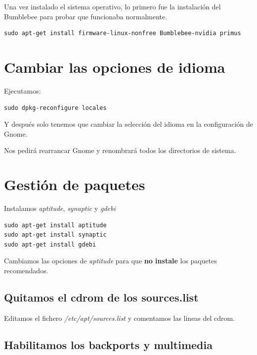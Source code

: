 \documentclass[12pt,spanish,]{scrartcl}
\begin{document}
Una vez instalado el sistema operativo, lo primero fue la instalación
del Bumblebee para probar que funcionaba normalmente.

\begin{verbatim}
sudo apt-get install firmware-linux-nonfree Bumblebee-nvidia primus
\end{verbatim}

\section{Cambiar las opciones de
idioma}\label{cambiar-las-opciones-de-idioma}

Ejecutamos:

\begin{verbatim}
sudo dpkg-reconfigure locales
\end{verbatim}

Y después solo tenemos que cambiar la selección del idioma en la
configuración de Gnome.

Nos pedirá rearrancar Gnome y renombrará todos los directorios de
sistema.

\section{Gestión de paquetes}\label{gestiuxf3n-de-paquetes}

Instalamos \emph{aptitude}, \emph{synaptic} y \emph{gdebi}

\begin{verbatim}
sudo apt-get install aptitude
sudo apt-get install synaptic
sudo apt-get install gdebi
\end{verbatim}

Cambiamos las opciones de \emph{aptitude} para que \textbf{no instale}
los paquetes recomendados.

\subsection{Quitamos el cdrom de los
sources.list}\label{quitamos-el-cdrom-de-los-sources.list}

Editamos el fichero \emph{/etc/apt/sources.list} y comentamos las lineas
del cdrom.

\subsection{Habilitamos los backports y
multimedia}\label{habilitamos-los-backports-y-multimedia}
\end{document}
